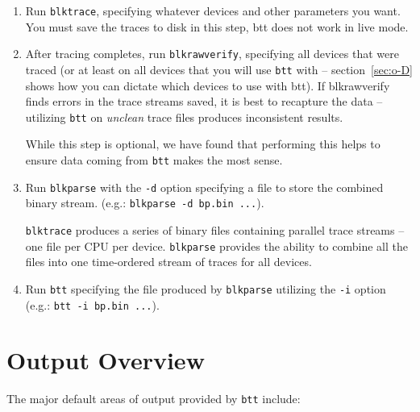 \documentclass{article}
\begin{document}
  \begin{enumerate}
    \item Run \texttt{blktrace}, specifying whatever devices and other
    parameters you want. You must save the traces to disk in this step,
    btt does not work in live mode.

    \item After tracing completes, run \texttt{blkrawverify}, specifying
    all devices that were traced (or at least on all devices that you
    will use \texttt{btt} with -- section~\ref{sec:o-D} shows how you
    can dictate which devices to use with btt). If blkrawverify finds
    errors in the trace streams saved, it is best to recapture the data
    -- utilizing \texttt{btt} on \emph{unclean} trace files produces
    inconsistent results.

    While this step is optional, we have found that performing this
    helps to ensure data coming from \texttt{btt} makes the most sense.

    \item Run \texttt{blkparse} with the \texttt{-d} option specifying
    a file to store the combined binary stream. (e.g.: \texttt{blkparse
    -d bp.bin ...}).

    \texttt{blktrace} produces a series of binary files
    containing parallel trace streams -- one file per CPU per
    device. \texttt{blkparse} provides the ability to combine all the
    files into one time-ordered stream of traces for all devices.

    \item Run \texttt{btt} specifying the file produced by
    \texttt{blkparse} utilizing the \texttt{-i} option (e.g.: \texttt{btt
    -i bp.bin ...}).

  \end{enumerate}

\newpage\section{\label{sec:output-overview}Output Overview}

  The major default areas of output provided by \texttt{btt}
  include\label{tl-defs}:
\end{document}
